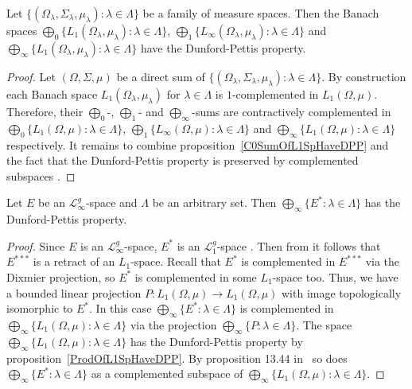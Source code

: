 \begin{proposition}\label{ProdOfL1SpHaveDPP} Let $
\{(\Omega_\lambda,\Sigma_\lambda,\mu_\lambda):\lambda\in\Lambda \}$ be a family
of measure spaces. 
Then the Banach spaces  
$\bigoplus_0 \{
    L_1(\Omega_\lambda, \mu_\lambda):\lambda\in\Lambda
 \}$, 
 $\bigoplus_1 \{
     L_\infty(\Omega_\lambda, \mu_\lambda):\lambda\in\Lambda
 \}$ 
and $\bigoplus_\infty \{
    L_1(\Omega_\lambda,\mu_\lambda):\lambda\in\Lambda
 \}$ have the Dunford-Pettis property.
\end{proposition}
\begin{proof} Let $(\Omega, \Sigma, \mu)$ be a direct sum of $
\{(\Omega_\lambda,\Sigma_\lambda,\mu_\lambda):\lambda\in\Lambda \}$. By
construction each Banach space $L_1(\Omega_\lambda,\mu_\lambda)$ for
$\lambda\in\Lambda$ is $1$-complemented in $L_1(\Omega, \mu)$. Therefore, their
$\bigoplus_0$-, $\bigoplus_1$- and $\bigoplus_\infty$-sums are contractively
complemented in $\bigoplus_0 \{L_1(\Omega, \mu):\lambda\in\Lambda \}$,
$\bigoplus_1 \{L_\infty(\Omega, \mu):\lambda\in\Lambda \}$ 
and $\bigoplus_\infty \{L_1(\Omega,\mu):\lambda\in\Lambda \}$ respectively. 
It remains to combine proposition~\ref{C0SumOfL1SpHaveDPP} and the fact 
that the Dunford-Pettis property is preserved by complemented 
subspaces \cite[proposition 13.44]{FabHabBanSpTh}.
\end{proof}

\begin{proposition}\label{ProdOfDualsOfMthscrLInftySpHaveDPP} Let $E$ be an
$\mathscr{L}_\infty^g$-space and $\Lambda$ be an arbitrary set. Then
$\bigoplus_\infty \{E^*:\lambda\in\Lambda \}$ has the Dunford-Pettis property.
\end{proposition}
\begin{proof} Since $E$ is an $\mathscr{L}_\infty^g$-space, $E^*$ is an
$\mathscr{L}_{1}^g$-space \cite[corollary 23.2.1(1)]{DefFloTensNorOpId}. Then
from \cite[corollary 23.2.1(3)]{DefFloTensNorOpId} it follows that $E^{***}$
is a retract of an $L_1$-space. Recall that $E^*$ is complemented in $E^{***}$ via
the Dixmier projection, so $E^*$ is complemented in some $L_1$-space too. Thus, we
have a bounded linear projection $P:L_1(\Omega,\mu)\to L_1(\Omega,\mu)$ with
image topologically isomorphic to $E^*$. In this 
case $\bigoplus_\infty \{E^*:\lambda\in\Lambda \}$ is complemented 
in $\bigoplus_\infty \{ L_1(\Omega,\mu):\lambda\in\Lambda \}$ via 
the projection $\bigoplus_\infty \{P:\lambda\in\Lambda \}$. The 
space $\bigoplus_\infty \{ L_1(\Omega,\mu):\lambda\in\Lambda \}$ has 
the Dunford-Pettis property by proposition~\ref{ProdOfL1SpHaveDPP}. By 
proposition 13.44 in~\cite{FabHabBanSpTh} so does 
$\bigoplus_\infty \{ E^*:\lambda\in\Lambda \}$ as a complemented subspace 
of $\bigoplus_\infty \{ L_1(\Omega,\mu):\lambda\in\Lambda \}$.
\end{proof}

